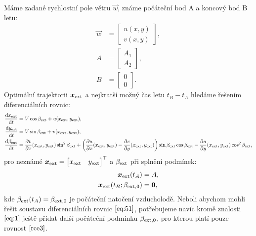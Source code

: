 \documentclass[reqno, a4paper]{amsart}
\numberwithin{equation}{section}
\begin{document}
Máme zadané rychlostní pole větru $\vec{w}$, známe počáteční bod A a koncový bod B letu:
\begin{align}
\vec{w}
& =
\begin{bmatrix}
    u(x,y) \\
    v(x,y)
  \end{bmatrix}
,\\
A
& =
  \begin{bmatrix}
    A_{1} \\
    A_{2} \end{bmatrix}
,\\
B
& =
  \begin{bmatrix}
    0 \\
    0 \end{bmatrix}
.
\end{align}
Optimální trajektorii $\bm{x}_{\mathrm{ext}}$ a nejkratší možný čas letu $t_{B}-t_{A}$ hledáme řešením diferenciálních rovnic:
\begin{subequations}
  \label{eq:51}
  \begin{align}
    \label{eq:52}
    \frac{\mathrm{d} {x_{\mathrm{ext}}}}{\mathrm{d} {t}} &= V \cos \beta_{\mathrm{ext}} + u(x_{\mathrm{ext}}, y_{\mathrm{ext}}),  \\
    \label{eq:53}
    \frac{\mathrm{d} {y_{\mathrm{ext}}}}{\mathrm{d} {t}} &= V \sin \beta_{\mathrm{ext}} + v(x_{\mathrm{ext}}, y_{\mathrm{ext}}),  \\
    \label{eq:54}
      \frac{\mathrm{d} {\beta_{\mathrm{ext}}}}{\mathrm{d} {t}}
                              &=
  \frac{\partial {v}}{\partial {x}}(x_{\mathrm{ext}}, y_{\mathrm{ext}})
  \sin^2 \beta_{\mathrm{ext}}
  +
  \left(
    \frac{\partial {u}}{\partial {x}}(x_{\mathrm{ext}}, y_{\mathrm{ext}})
    -
    \frac{\partial {v}}{\partial {y}}(x_{\mathrm{ext}}, y_{\mathrm{ext}})
  \right)
  \sin \beta_{\mathrm{ext}}
  \cos \beta_{\mathrm{ext}}
  -
  \frac{\partial {u}}{\partial {y}}(x_{\mathrm{ext}}, y_{\mathrm{ext}})
  \cos^2 \beta_{\mathrm{ext}}
    ,
  \end{align}
\end{subequations}
pro neznámé $\vec{x}_{\navext}=
  \transpose{
  \begin{bmatrix}
    x_{\navext} &
    y_{\navext}
  \end{bmatrix}
  }
$ a $\beta_{\mathrm{ext}}$ při splnění podmínek:
\begin{align}
  \bm{x}_{\mathrm{ext}}(t_{A}) & = A ,\\
  \label{rce3}
  \bm{x}_{\mathrm{ext}}(t_{B} ; \beta_{\mathrm{ext}, 0}) & = \bm{0},
\end{align}
kde $\beta_{\mathrm{ext}}(t_{A})=\beta_{\mathrm{ext}, 0}$ je počáteční natočení vzducholodě. Neboli abychom mohli řešit soustavu diferenciálních rovnic $\eqref{eq:51}$, potřebujeme navíc kromě znalosti $\eqref{eq:1}$ ještě přidat další počáteční podmínku $\beta_{\mathrm{ext}, 0}$, pro kterou platí pouze rovnost $\eqref{rce3}$.
\end{document}

